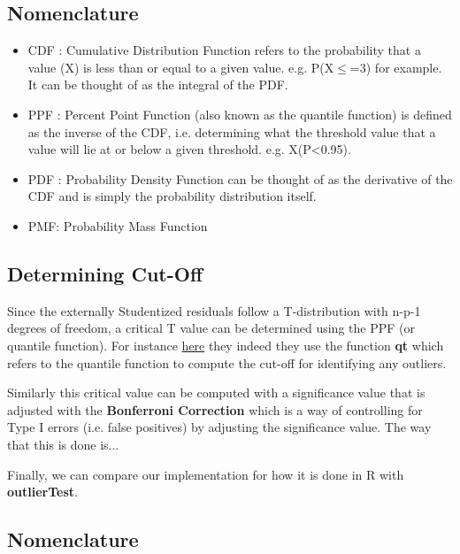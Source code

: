 \documentclass{article}
\begin{document}
\subsection{Nomenclature}

\begin{itemize}
	\item CDF : Cumulative Distribution Function refers to the probability that a value (X) is less than or equal to a given value. e.g. P(X$\leq$=3) for example. It can be thought of as the integral of the PDF. 
	\item PPF : Percent Point Function (also known as the quantile function) is defined as the inverse of the CDF, i.e. determining what the threshold value that a value will lie at or below a given threshold. e.g. X(P<0.95). 
	\item PDF : Probability Density Function can be thought of as the derivative of the CDF and is simply the probability distribution itself. 
	\item PMF: Probability Mass Function 
\end{itemize}


\subsection{Determining Cut-Off}

Since the externally Studentized residuals follow a T-distribution with n-p-1 degrees of freedom, a critical T value can be determined using the PPF (or quantile function). For instance  \href{https://web.stanford.edu/class/stats191/notebooks/Diagnostics_for_multiple_regression.html}{here} they indeed they use the function \textbf{qt} which refers to the quantile function to compute the cut-off for identifying any outliers. 

Similarly this critical value can be computed with a significance value that is adjusted with the \textbf{Bonferroni Correction} which is a way of controlling for Type I errors (i.e. false positives) by adjusting the significance value. The way that this is done is...

Finally, we can compare our implementation for how it is done in R with \textbf{outlierTest}. 

\subsection{Nomenclature}
	
\end{document}
